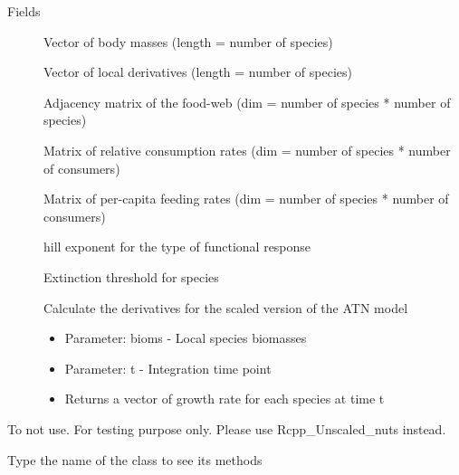 \documentclass[letterpaper]{book}
\begin{document}
\begin{Section}{Fields}
\begin{description}
\item[] Vector of body masses (length = number of species)

\item[] Vector of local derivatives (length = number of species)

\item[] Adjacency matrix of the food-web (dim = number of species * number of species)

\item[] Matrix of relative consumption rates (dim = number of species * number of consumers)

\item[] Matrix of per-capita feeding rates (dim = number of species * number of consumers)

\item[] hill exponent for the type of functional response

\item[] Extinction threshold for species

\item[] Calculate the derivatives for the scaled version of the ATN model \begin{itemize}

\item{} Parameter: bioms -  Local species biomasses
\item{} Parameter: t - Integration time point
\item{} Returns a vector of growth rate for each species at time t

\end{itemize}


\end{description}
\end{Section}
%
\begin{Description}\relax
To not use. For testing purpose only. Please use Rcpp\_Unscaled\_nuts instead.
\end{Description}
%
\begin{Description}\relax
Type the name of the class to see its methods
\end{Description}
%
\end{document}
